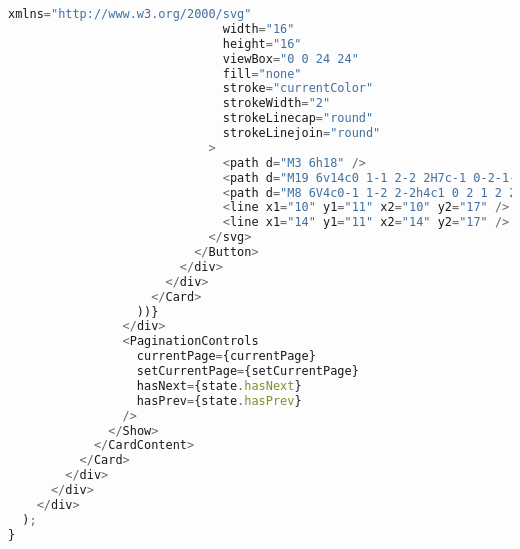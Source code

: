 \begin{lstlisting}[language=TypeScript, caption={Pembuatan Sitasi}, inputencoding=utf8]
                              xmlns="http://www.w3.org/2000/svg"
                              width="16"
                              height="16"
                              viewBox="0 0 24 24"
                              fill="none"
                              stroke="currentColor"
                              strokeWidth="2"
                              strokeLinecap="round"
                              strokeLinejoin="round"
                            >
                              <path d="M3 6h18" />
                              <path d="M19 6v14c0 1-1 2-2 2H7c-1 0-2-1-2-2V6" />
                              <path d="M8 6V4c0-1 1-2 2-2h4c1 0 2 1 2 2v2" />
                              <line x1="10" y1="11" x2="10" y2="17" />
                              <line x1="14" y1="11" x2="14" y2="17" />
                            </svg>
                          </Button>
                        </div>
                      </div>
                    </Card>
                  ))}
                </div>
                <PaginationControls
                  currentPage={currentPage}
                  setCurrentPage={setCurrentPage}
                  hasNext={state.hasNext}
                  hasPrev={state.hasPrev}
                />
              </Show>
            </CardContent>
          </Card>
        </div>
      </div>
    </div>
  );
}
\end{lstlisting}